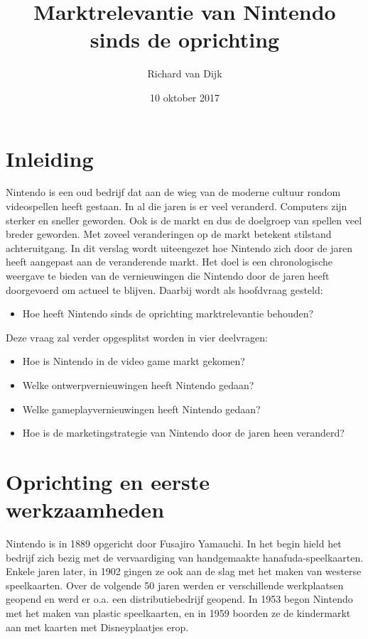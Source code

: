 \documentclass{article}
\title{Marktrelevantie van Nintendo sinds de oprichting}
\date{10 oktober 2017}
\author{Richard van Dijk}
\begin{document}
\maketitle






\section{Inleiding}

Nintendo is een oud bedrijf dat aan de wieg van de moderne cultuur rondom videospellen heeft gestaan. In al die jaren is er veel veranderd. Computers zijn sterker en sneller geworden. Ook is de markt en dus de doelgroep van spellen veel breder geworden. Met zoveel veranderingen op de markt betekent stilstand achteruitgang. In dit verslag wordt uiteengezet hoe Nintendo zich door de jaren heeft aangepast aan de veranderende markt. Het doel is een chronologische weergave te bieden van de vernieuwingen die Nintendo door de jaren heeft doorgevoerd om actueel te blijven. Daarbij wordt als hoofdvraag gesteld:
\begin{itemize} \item Hoe heeft Nintendo sinds de oprichting marktrelevantie behouden? \end{itemize}
Deze vraag zal verder opgesplitst worden in vier deelvragen:
\begin{itemize}
\item Hoe is Nintendo in de video game markt gekomen?
\item Welke ontwerpvernieuwingen heeft Nintendo gedaan?
\item Welke gameplayvernieuwingen heeft Nintendo gedaan?
\item Hoe is de marketingstrategie van Nintendo door de jaren heen veranderd?
\end{itemize}

\section{Oprichting en eerste werkzaamheden}
Nintendo is in 1889 opgericht door Fusajiro Yamauchi. In het begin hield het bedrijf zich bezig met de vervaardiging van handgemaakte hanafuda-speelkaarten. Enkele jaren later, in 1902 gingen ze ook aan de slag met het maken van westerse speelkaarten. Over de volgende 50 jaren werden er verschillende werkplaatsen geopend en werd er o.a. een distributiebedrijf geopend. In 1953 begon Nintendo met het maken van plastic speelkaarten, en in 1959 boorden ze de kindermarkt aan met kaarten met Disneyplaatjes erop. 
\end{document}
